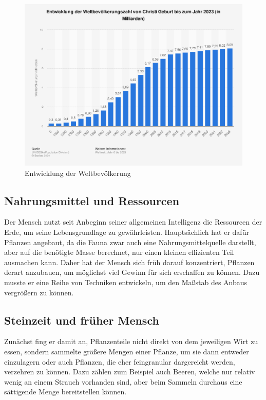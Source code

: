 \begin{figure}
    \centering
    \includegraphics[width=1\linewidth]{1694.png}
    \caption{Entwicklung der Weltbevölkerung}
    \label{fig:enter-label}
\end{figure}
\subsection{Nahrungsmittel und Ressourcen}
Der Mensch nutzt seit Anbeginn seiner allgemeinen Intelligenz die Ressourcen der Erde, um seine Lebensgrundlage zu gewährleisten. Hauptsächlich hat er dafür Pflanzen angebaut, da die Fauna zwar auch eine Nahrungsmittelquelle darstellt, aber auf die benötigte Masse berechnet, nur einen kleinen effizienten Teil ausmachen kann. Daher hat der Mensch sich früh darauf konzentriert, Pflanzen derart anzubauen, um möglichst viel Gewinn für sich erschaffen zu können. Dazu musste er eine Reihe von Techniken entwickeln, um den Maßstab des Anbaus vergrößern zu können. 
\subsection{Steinzeit und früher Mensch}
Zunächst fing er damit an, Pflanzenteile nicht direkt von dem jeweiligen Wirt zu essen, sondern sammelte größere Mengen einer Pflanze, um sie dann entweder einzulagern oder auch Pflanzen, die eher feingranular dargereicht werden, verzehren zu können. Dazu zählen zum Beispiel auch Beeren, welche nur relativ wenig an einem Strauch vorhanden sind, aber beim Sammeln durchaus eine sättigende Menge bereitstellen können.

